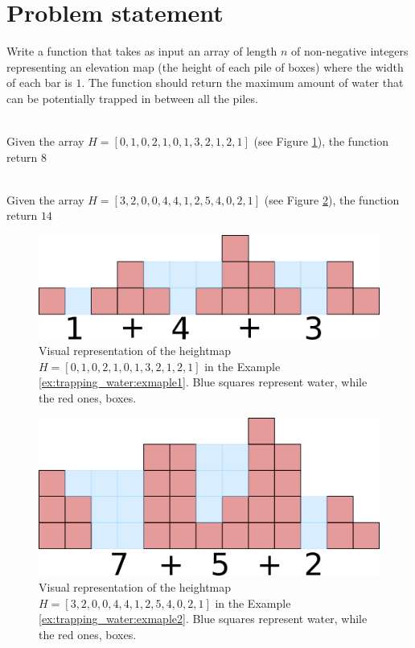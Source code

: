 \section{Problem statement}
\begin{exercise}
Write a function that takes as input an array of length $n$ of non-negative integers representing an elevation map (the height of each pile of boxes) where the width of each bar is $1$. 
The function should return the maximum amount of water that can be potentially trapped in between all the piles. 

	\begin{example}
		\label{ex:trapping_water:exmaple1}
		\hfill \\
		Given the array $H=[0,1,0,2,1,0,1,3,2,1,2,1]$ (see Figure \ref{fig:trapping_water_example1}), the function return $8$
	\end{example}

	\begin{example}
		\label{ex:trapping_water:exmaple2}
		\hfill \\
		Given the array $H=[3,2,0,0,4,4,1,2,5,4,0,2,1]$ (see Figure \ref{fig:trapping_water_example2}), the function return $14$
	\end{example}

\end{exercise}

\begin{figure}
	\centering
	\includegraphics[scale=1.0]{sources/trapping_water/images/example1}
	\caption{Visual representation of the heightmap $H=[0,1,0,2,1,0,1,3,2,1,2,1]$ in the Example \ref{ex:trapping_water:exmaple1}. Blue squares represent water, while the red ones, boxes.}
	\label{fig:trapping_water_example1}
\end{figure}



\begin{figure}
	\centering
	\includegraphics[scale=1.0]{sources/trapping_water/images/example2}
	\caption{Visual representation of the heightmap $H=[3,2,0,0,4,4,1,2,5,4,0,2,1]$ in the Example \ref{ex:trapping_water:exmaple2}. Blue squares represent water, while the red ones, boxes.}
	\label{fig:trapping_water_example2}
\end{figure}

